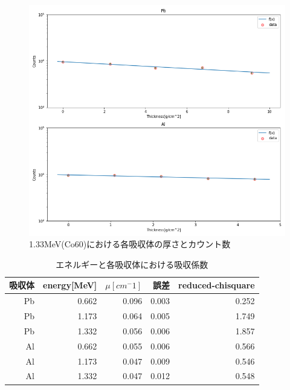 \documentclass[a4paper,12pt]{jarticle}
\begin{document}
  \begin{figure}[htbp]
   \begin{center}
   \includegraphics[clip,width=14.0cm]{Co60_right.png}
    \caption{1.33MeV(Co60)における各吸収体の厚さとカウント数}
    \label{fig:Co60_right}
   \end{center}
  \end{figure}


  \begin{table}[h]
   \begin{center}

       \caption{エネルギーと各吸収体における吸収係数}
        \begin{tabular}{|r|r|r|r|r|}
         \hline
         吸収体 & energy[MeV] & $\mu[cm^-1]$ & 誤差 & reduced-chisquare \\
         \hline
         Pb & 0.662  & 0.096  & 0.003  & 0.252  \\
         Pb & 1.173  & 0.064  & 0.005  & 1.749  \\
         Pb & 1.332  & 0.056  & 0.006  & 1.857  \\
         Al & 0.662  & 0.055  & 0.006  & 0.566  \\
         Al & 1.173  & 0.047  & 0.009  & 0.546  \\
         Al & 1.332  & 0.047  & 0.012  & 0.548  \\
         \hline
        \end{tabular}
       \label{table:result}

   \end{center}
  \end{table}
\end{document}
